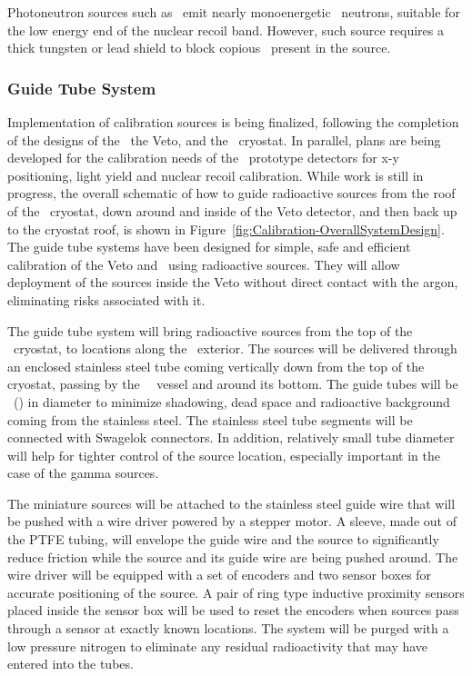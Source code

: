 Photoneutron sources such as \YBe\ emit nearly monoenergetic \YBeNeutronEnergy\ neutrons, suitable for the low energy end of the nuclear recoil band. However, such source requires a %
thick tungsten or lead shield to block copious \grs\ present in the source. 


\subsubsection{Guide Tube System}

Implementation of calibration sources is being finalized, following the completion of the designs of the \TPC\, the Veto, and the \AAr\ cryostat. In parallel, plans are being developed for the calibration needs of the \DSks\ prototype detectors for x-y positioning, light yield and nuclear recoil calibration. While work is still in progress, the overall schematic of how to guide radioactive sources from the roof of the \AAr\ cryostat, down around and inside of the Veto detector, and then back up to the cryostat roof, is shown in Figure~\ref{fig:Calibration-OverallSystemDesign}.  The guide tube systems have been designed for simple, safe and efficient calibration of the Veto and \TPC\ using radioactive sources. They will allow deployment of the sources inside the Veto without direct contact with the argon, eliminating risks associated with it. 

The guide tube system will bring radioactive sources from the top of the \AAr\ cryostat, to locations along the \TPC\ exterior. The sources will be delivered through an enclosed stainless steel tube coming vertically down from the top of the cryostat, passing by the \TPC\ \PMMA\ vessel and around its bottom. The guide tubes will be \CalGuideTubeDiameter\ (\CalGuideTubeDiameterInches) in diameter to minimize shadowing, dead space and radioactive background coming from the stainless steel. The stainless steel tube segments will be connected with Swagelok connectors. In addition, relatively small tube diameter will help for tighter control of the source location, especially important in the case of the gamma sources. 

The miniature sources will be attached to the stainless steel guide wire that will be pushed with a wire driver powered by a stepper motor. A sleeve, made out of the PTFE tubing, will envelope the guide wire and the source to significantly reduce friction while the source and its guide wire are being pushed around. The wire driver will be equipped with a set of encoders and two sensor boxes for accurate positioning of the source. A pair of ring type inductive proximity sensors placed inside the sensor box will be used to reset the encoders when sources pass through a sensor at exactly known locations. The system will be purged with a low pressure nitrogen to eliminate any residual radioactivity that may have entered into the tubes.

